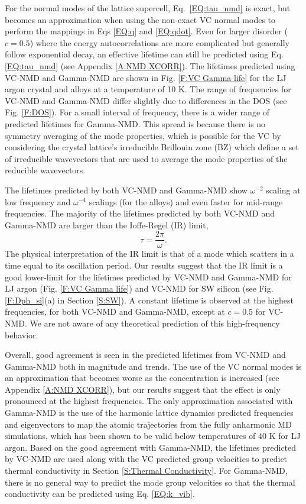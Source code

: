 \documentclass[aps,prb,onecolumn,preprint,superscriptaddress,amsmath,amssymb,floatfix]{revtex4}
\begin{document}
For the normal modes of the lattice supercell, 
Eq.~\eqref{EQ:tau_nmd} is exact, but becomes an approximation when 
using the non-exact VC normal modes to perform the mappings in Eqs 
\eqref{EQ:q} and \eqref{EQ:qdot}. 
Even for larger disorder ($c=0.5$) 
where the energy autocorrelations 
are more complicated but generally follow exponential decay, 
an effective lifetime can still be predicted 
using Eq. \eqref{EQ:tau_nmd} (see Appendix \ref{A:NMD XCORR}). 
The lifetimes predicted using VC-NMD and Gamma-NMD  
are shown in Fig. \ref{F:VC Gamma life} for the LJ argon crystal 
and alloys at a temperature of 10 K. 
The range of frequencies for 
VC-NMD and Gamma-NMD differ slightly due to differences in 
the DOS (see Fig. \ref{F:DOS}). 
For a small interval of frequency, there is a wider range of 
predicted lifetimes for Gamma-NMD. This spread is because there 
is no symmetry averaging of the mode properties, 
which is possible for the VC by considering the crystal 
lattice's irreducible Brillouin zone (BZ) which  
define a set of irreducible wavevectors that are used to average 
the mode properties of the reducible 
wavevectors.\cite{ashcroft_solid_1976} 

The lifetimes predicted by both VC-NMD and Gamma-NMD 
show $\omega^{-2}$ scaling at low frequency and $\omega^{-4}$ 
scalings (for the alloys) and 
even faster for mid-range frequencies. 
The majority of the lifetimes predicted by both VC-NMD and Gamma-NMD  
are larger than the Ioffe-Regel (IR) limit,
\cite{taraskin_determination_1999} 
\begin{equation}\label{EQ:IR}
\tau = \frac{2\pi}{\omega}.
\end{equation}
The physical interpretation of the IR limit is that of a mode which 
scatters in a time equal to its oscillation period. Our results suggest 
that the IR limit is a good lower-limit for the lifetimes predicted 
by VC-NMD and Gamma-NMD 
for LJ argon (Fig. \ref{F:VC Gamma life}) 
and VC-NMD for SW silicon (see Fig. \ref{F:Dph_si}(a) in 
Section \ref{S:SW}). 
A constant lifetime is observed at the highest frequencies, 
for both VC-NMD and Gamma-NMD, 
except at $c=0.5$ for VC-NMD.  
We are not aware of any theoretical 
prediction of this high-frequency behavior.

Overall, good agreement is seen in the predicted lifetimes from VC-NMD and 
Gamma-NMD both in magnitude and trends. The use of the VC normal modes 
is an approximation that becomes worse as the concentration is increased 
(see Appendix \ref{A:NMD XCORR}), but our results suggest that the effect 
is only pronounced at the highest frequencies. 
The only approximation associated with Gamma-NMD is the use  
of the harmonic lattice dynamics predicted frequencies and eigenvectors 
to map the atomic trajectories from the fully anharmonic MD simulations, 
which has been shown to be valid below temperatures of 40 K for LJ argon.
\cite{turney_predicting_2009} 
Based on the good agreement with Gamma-NMD, the 
lifetimes predicted by VC-NMD are used along with the VC predicted 
group velocities to 
predict thermal conductivity in Section \ref{S:Thermal Conductivity}. 
For Gamma-NMD, there is no general way to predict the mode 
group velocities so that the thermal conductivity can be predicted 
using Eq. \ref{EQ:k_vib}. 
\end{document}
